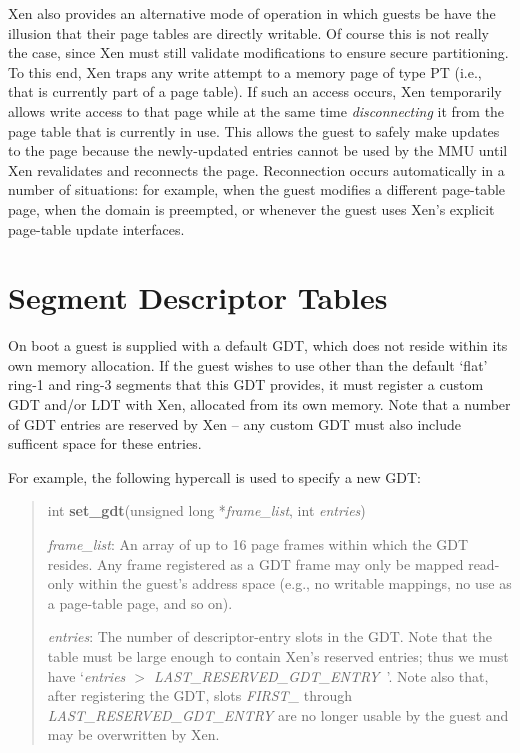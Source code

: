 \documentclass[11pt,twoside,final,openright]{xenstyle}
\begin{document}

Xen also provides an alternative mode of operation in which guests be
have the illusion that their page tables are directly writable.  Of
course this is not really the case, since Xen must still validate
modifications to ensure secure partitioning. To this end, Xen traps
any write attempt to a memory page of type {\sf PT} (i.e., that is
currently part of a page table).  If such an access occurs, Xen
temporarily allows write access to that page while at the same time
{\em disconnecting} it from the page table that is currently in
use. This allows the guest to safely make updates to the page because
the newly-updated entries cannot be used by the MMU until Xen
revalidates and reconnects the page.
Reconnection occurs automatically in a number of situations: for
example, when the guest modifies a different page-table page, when the
domain is preempted, or whenever the guest uses Xen's explicit
page-table update interfaces.


\section{Segment Descriptor Tables}

On boot a guest is supplied with a default GDT, which does not reside
within its own memory allocation.  If the guest wishes to use other
than the default `flat' ring-1 and ring-3 segments that this GDT
provides, it must register a custom GDT and/or LDT with Xen,
allocated from its own memory. Note that a number of GDT 
entries are reserved by Xen -- any custom GDT must also include
sufficent space for these entries. 

For example, the following hypercall is used to specify a new GDT: 

\begin{quote}
int {\bf set\_gdt}(unsigned long *{\em frame\_list}, int {\em entries})

{\em frame\_list}: An array of up to 16 page frames within which the
GDT resides.  Any frame registered as a GDT frame may only be mapped
read-only within the guest's address space (e.g., no writable
mappings, no use as a page-table page, and so on).

{\em entries}: The number of descriptor-entry slots in the GDT.  Note
that the table must be large enough to contain Xen's reserved entries;
thus we must have `{\em entries $>$ LAST\_RESERVED\_GDT\_ENTRY}\ '.
Note also that, after registering the GDT, slots {\em FIRST\_} through
{\em LAST\_RESERVED\_GDT\_ENTRY} are no longer usable by the guest and
may be overwritten by Xen.
\end{quote}
\end{document}

